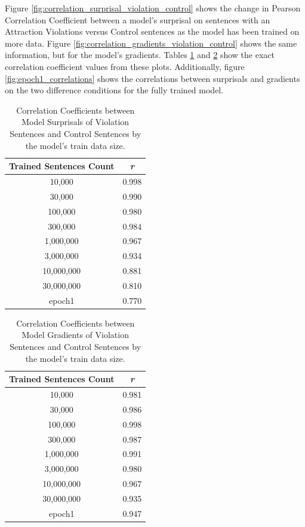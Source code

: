 \documentclass{IEEEtran}
\begin{document}
Figure \ref{fig:correlation_surprisal_violation_control} shows the change in Pearson Correlation Coefficient between a model's surprisal on sentences with an Attraction Violations versus Control sentences as the model has been trained on more data.
Figure \ref{fig:correlation_gradients_violation_control} shows the same information, but for the model's gradients.
Tables \ref{tab:correlation_surprisal_violations_control} and \ref{tab:correlation_gradients_violations_control} show the exact correlation coefficient values from these plots.
Additionally, figure \ref{fig:epoch1_correlations} shows the correlations between surprisals and gradients on the two difference conditions for the fully trained model.

\begin{table}
    \centering
    \begin{tabular}{c|c}
        \textbf{Trained Sentences Count} & \textbf{\textit{r}} \\
        \hline
        10,000&0.998\\
        30,000&0.990\\
        100,000&0.980\\
        300,000&0.984\\
        1,000,000&0.967\\
        3,000,000&0.934\\
        10,000,000&0.881\\
        30,000,000&0.810\\
        epoch1&0.770
    \end{tabular}
    \caption{Correlation Coefficients between Model Surprisals of Violation Sentences and Control Sentences by the model's train data size.}
    \label{tab:correlation_surprisal_violations_control}
\end{table}
\begin{table}
    \centering
    \begin{tabular}{c|c}
        \textbf{Trained Sentences Count} & \textbf{\textit{r}} \\
        \hline
        10,000&0.981\\
        30,000&0.986\\
        100,000&0.998\\
        300,000&0.987\\
        1,000,000&0.991\\
        3,000,000&0.980\\
        10,000,000&0.967\\
        30,000,000&0.935\\
        epoch1&0.947
    \end{tabular}
    \caption{Correlation Coefficients between Model Gradients of Violation Sentences and Control Sentences by the model's train data size.}
    \label{tab:correlation_gradients_violations_control}
\end{table}
\end{document}
